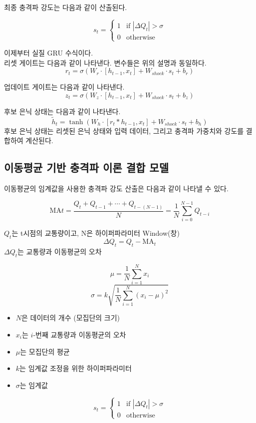 \documentclass[11pt]{report}
\begin{document}
최종 충격파 강도는 다음과 같이 산출된다. 

$$
s_t = \begin{cases}
	1 & \text{if } |\Delta Q_t| > \sigma \\
	0 & \text{otherwise}
	\end{cases}
$$

이제부터 실질 GRU 수식이다. \\
리셋 게이트는 다음과 같이 나타낸다. 변수들은 위의 설명과 동일하다. 
$$
r_t = \sigma(W_r \cdot [h_{t-1}, x_t] + W_{shock} \cdot s_t + b_r)
$$

업데이트 게이트는 다음과 같이 나타낸다. 
$$
z_t = \sigma(W_z \cdot [h_{t-1}, x_t] + W_{shock} \cdot s_t + b_z)
$$

후보 은닉 상태는 다음과 같이 나타낸다. 
$$
\tilde{h}_t = \tanh(W_h \cdot [r_t \ast h_{t-1}, x_t] + W_{shock} \cdot s_t + b_h)
$$
후보 은닉 상태는 리셋된 은닉 상태와 입력 데이터, 그리고 충격파 가중치와 강도를 결합하여 계산된다.

\subsection{이동평균 기반 충격파 이론 결합 모델}
이동평균의 임계값을 사용한 충격파 강도 산출은 다음과 같이 나타낼 수 있다.

$$
\text{MA}t = \frac{Q_t + Q_{t-1} + \cdots + Q_{t-(N-1)}}{N} = \frac{1}{N} \sum_{i=0}^{N-1} Q_{t-i}
$$

$Q_t$는 t시점의 교통량이고, N은 하이퍼파라미터 Window(창) 
$$
\Delta Q_t = Q_t - \text{MA}_t
$$
$\Delta Q_t$는 교통량과 이동평균의 오차

$$
\mu = \frac{1}{N} \sum_{i=1}^{N} x_i
$$
$$
\sigma = k \sqrt{\frac{1}{N} \sum_{i=1}^{N} (x_i - \mu)^2}
$$

\begin{itemize}
    \item $N$은 데이터의 개수 (모집단의 크기)
    \item $x_i$는 $i$-번째 교통량과 이동평균의 오차
    \item $\mu$는 모집단의 평균
    \item $k$는 임계값 조정을 위한 하이퍼파라미터
    \item $\sigma$는 임계값
\end{itemize}

$$
s_t = \begin{cases}
	1 & \text{if } |\Delta Q_t| > \sigma \\
	0 & \text{otherwise}
	\end{cases}
$$
\end{document}
